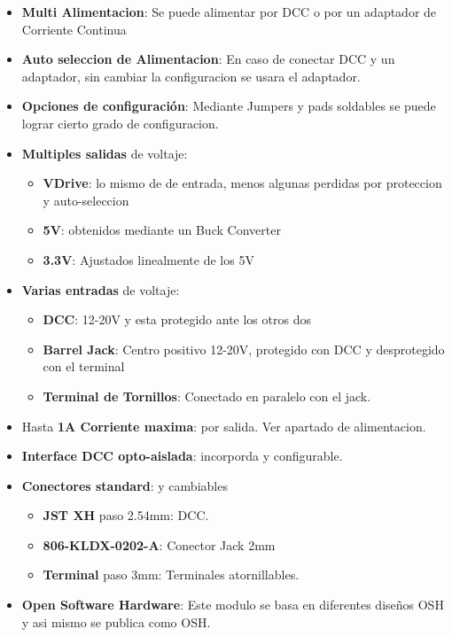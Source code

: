 \documentclass{DccDiyTools}
\begin{document}
\begin{itemize}
    \item \textbf{Multi Alimentacion}: Se puede alimentar por DCC o por un adaptador de Corriente Continua
    \item \textbf{Auto seleccion de Alimentacion}: En caso de conectar DCC y un adaptador, sin cambiar la configuracion se usara el adaptador.
    \item \textbf{Opciones de configuración}: Mediante Jumpers y pads soldables se puede lograr cierto grado de configuracion.
    \item \textbf{Multiples salidas} de voltaje:
    \begin{itemize}
        \item \textbf{VDrive}: lo mismo de de entrada, menos algunas perdidas por proteccion y auto-seleccion
        \item \textbf{5V}: obtenidos mediante un Buck Converter
        \item \textbf{3.3V}: Ajustados linealmente de los 5V
    \end{itemize}
    \item \textbf{Varias entradas} de voltaje:
    \begin{itemize}
        \item \textbf{DCC}: 12-20V y esta protegido ante los otros dos
        \item \textbf{Barrel Jack}: Centro positivo 12-20V, protegido con DCC y desprotegido con el terminal 
        \item \textbf{Terminal de Tornillos}: Conectado en paralelo con el jack.
    \end{itemize}
    \item Hasta \textbf{1A Corriente maxima}: por salida. Ver apartado de alimentacion.
    \item \textbf{Interface DCC opto-aislada}: incorporda y configurable.
    \item \textbf{Conectores standard}: y cambiables
    \begin{itemize}
        \item \textbf{JST XH} paso 2.54mm: DCC. 
        \item \textbf{806-KLDX-0202-A}: Conector Jack 2mm 
        \item \textbf{Terminal} paso 3mm: Terminales atornillables.
    \end{itemize} 
    \item \textbf{Open Software Hardware}: Este modulo se basa en diferentes diseños OSH y asi mismo se publica como OSH.
\end{itemize}
\end{document}
